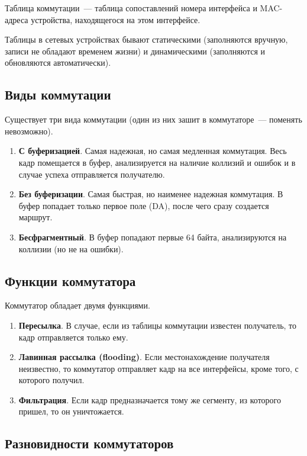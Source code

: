 \begin{dd}
    Таблица коммутации~--- таблица сопоставлений номера интерфейса и MAC-адреса устройства, находящегося на этом интерфейсе.
\end{dd}

Таблицы в сетевых устройствах бывают статическими (заполняются вручную, записи не обладают временем жизни) и динамическими (заполняются и обновляются автоматически).

\subsection{Виды коммутации}

Существует три вида коммутации (один из них зашит в коммутаторе~--- поменять невозможно).

\begin{enumerate}
    \item \textbf{С буферизацией}. Самая надежная, но самая медленная коммутация. Весь кадр помещается в буфер, анализируется на наличие коллизий и ошибок и в случае успеха отправляется получателю.
    \item \textbf{Без буферизации}. Самая быстрая, но наименее надежная коммутация. В буфер попадает только первое поле (DA), после чего сразу создается маршрут.
    \item \textbf{Бесфрагментный}. В буфер попадают первые 64 байта, анализируются на коллизии (но не на ошибки).
\end{enumerate}

\subsection{Функции коммутатора}

Коммутатор обладает двумя функциями.

\begin{enumerate}
    \item \textbf{Пересылка}. В случае, если из таблицы коммутации известен получатель, то кадр отправляется только ему.
    \item \textbf{Лавинная рассылка (flooding)}. Если местонахождение получателя неизвестно, то коммутатор отправляет кадр на все интерфейсы, кроме того, с которого получил.
    \item \textbf{Фильтрация}. Если кадр предназначается тому же сегменту, из которого пришел, то он уничтожается.
\end{enumerate}

\subsection{Разновидности коммутаторов}

